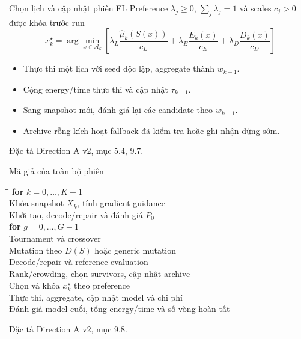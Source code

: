 \documentclass[10pt,aspectratio=43]{beamer}
\newcommand{\src}[1]{\par\vfill{\fontsize{6}{7.2}\selectfont\color{Muted}
 Đặc tả Direction A v2, mục #1.\par}}
\begin{document}
\begin{frame}[t]{Chọn lịch và cập nhật phiên FL}
\relax
Preference $\lambda_j\ge0$, $\sum_j\lambda_j=1$ và scales $c_j>0$ được khóa trước run
\[
\boxed{\displaystyle
x_k^\star=\arg\min_{x\in\mathcal A_k}
\left[
\lambda_L\frac{\widehat\mu_k(S(x))}{c_L}
+\lambda_E\frac{E_k(x)}{c_E}
+\lambda_D\frac{D_k(x)}{c_D}
\right]}
\]
\begin{itemize}
\item Thực thi một lịch với seed độc lập, aggregate thành $w_{k+1}$.
\item Cộng energy/time thực thi và cập nhật $\tau_{k+1}$.
\item Sang snapshot mới, đánh giá lại các candidate theo $w_{k+1}$.
\item Archive rỗng kích hoạt fallback đã kiểm tra hoặc ghi nhận dừng sớm.
\end{itemize}
\src{5.4, 9.7}
\end{frame}

\begin{frame}[t]{Mã giả của toàn bộ phiên}
\relax
{\small
\begin{tabbing}
\hspace{.4cm}\=\hspace{.4cm}\=\kill
\textbf{for} $k=0,\ldots,K-1$\\[.3em]
\> Khóa snapshot $X_k$, tính gradient guidance\\
\> Khởi tạo, decode/repair và đánh giá $P_0$\\[.3em]
\> \textbf{for} $g=0,\ldots,G-1$\\
\>\> Tournament và crossover\\
\>\> Mutation theo $D(S)$ hoặc generic mutation\\
\>\> Decode/repair và reference evaluation\\
\>\> Rank/crowding, chọn survivors, cập nhật archive\\[.3em]
\> Chọn và khóa $x_k^\star$ theo preference\\
\> Thực thi, aggregate, cập nhật model và chi phí\\[.3em]
Đánh giá model cuối, tổng energy/time và số vòng hoàn tất
\end{tabbing}
}
\src{9.8}
\end{frame}
\end{document}
